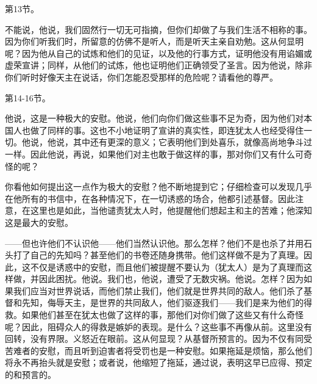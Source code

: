 第13节。 \par

不能说，他说，我们固然行一切无可指摘，但你们却做了与我们生活不相称的事。因为你们听我们时，所留意的仿佛不是听人，而是听天主亲自劝勉。这从何显明呢？因为他从自己的试炼和他们的见证，以及他的行事方式，证明他没有用谄媚或虚荣宣讲；同样，从他们的试炼，他也证明他们正确领受了圣言。因为他说，除非你们听时好像天主在说话，你们怎能忍受那样的危险呢？请看他的尊严。\par

第14-16节。 \par

他说，这是一种极大的安慰。他说，他们向你们做这些事不足为奇，因为他们对本国人也做了同样的事。这也不小地证明了宣讲的真实性，即连犹太人也经受得住一切。他说，他说，其中还有更深的意义；它表明他们到处喜乐，就像高尚地争斗过一样。因此他说，再说，如果他们对主也敢于做这样的事，那对你们又有什么可奇怪的呢？\par

你看他如何提出这一点作为极大的安慰？他不断地提到它；仔细检查可以发现几乎在他所有的书信中，在各种情况下，在一切诱惑的场合，他都引述基督。因此注意，在这里也是如此，当他谴责犹太人时，他提醒他们想起主和主的苦难；他深知这是最大的安慰。\par

——但也许他们不认识他——他们当然认识他。那么怎样？他们不是也杀了并用石头打了自己的先知吗？甚至他们的书卷还随身携带。他们这样做不是为了真理。因此，这不仅是诱惑中的安慰，而且他们被提醒不要认为（犹太人）是为了真理而这样做，并因此困扰。他说。我们也，他说，遭受了无数灾祸。他说。怎样？因为如果我们应当对世界说话，而他们禁止我们，他们就是世界共同的敌人。他们杀了基督和先知，侮辱天主，是世界的共同敌人，他们驱逐我们——我们是来为他们的得救。如果他们甚至在犹太也做了这样的事，那他们对你们做了这些又有什么奇怪呢？因此，阻碍众人的得救是嫉妒的表现。是什么？这些事不再像从前。这里没有回转，没有界限。义怒近在眼前。这从何显现？从基督所预言的。因为不仅有同受苦难者的安慰，而且听到迫害者将受罚也是一种安慰。如果拖延是烦恼，那么他们将永不再抬头就是安慰；或者说，他缩短了拖延，通过说，表明这早已应得、预定的和预言的。\par

